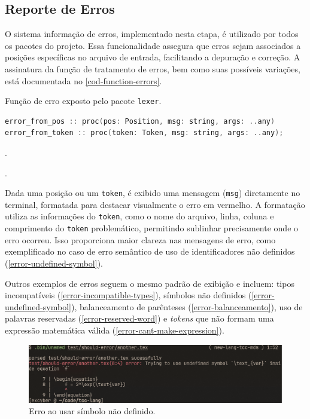 \subsection{Reporte de Erros} \label{subsection-erros}

O sistema informação de erros, implementado nesta etapa, é utilizado por todos os pacotes do projeto. Essa funcionalidade assegura que erros sejam associados a posições específicas no arquivo de entrada, facilitando a depuração e correção. A assinatura da função de tratamento de erros, bem como suas possíveis variações, está documentada no \autoref{cod-function-errors}.

\begin{codigo}[H]
    \caption{\small Função de erro exposto pelo pacote \texttt{lexer}. }
        \label{cod-function-errors}
\begin{lstlisting}[language=C++]
error_from_pos :: proc(pos: Position, msg: string, args: ..any)
error_from_token :: proc(token: Token, msg: string, args: ..any);
\end{lstlisting}.
\end{codigo}.



Dada uma posição ou um \texttt{token}, é exibido uma mensagem (\texttt{msg}) diretamente no terminal, formatada para destacar visualmente o erro em vermelho. A formatação utiliza as informações do \texttt{token}, como o nome do arquivo, linha, coluna e comprimento do \texttt{token} problemático, permitindo sublinhar precisamente onde o erro ocorreu. Isso proporciona maior clareza nas mensagens de erro, como exemplificado no caso de erro semântico de uso de identificadores não definidos (\autoref{error-undefined-symbol}).

Outros exemplos de erros seguem o mesmo padrão de exibição e incluem: tipos incompatíveis (\autoref{error-incompatible-types}), símbolos não definidos (\autoref{error-undefined-symbol}), balanceamento de parênteses (\autoref{error-balanceamento}), uso de palavras reservadas (\autoref{error-reserved-word}) e \textit{tokens} que não formam uma expressão matemática válida (\autoref{error-cant-make-expression}).

\begin{figure}[H]
    \caption{\label{error-undefined-symbol} \small Erro ao usar símbolo não definido.}
    \begin{center}
        \includegraphics[scale=0.5]{./Imagens/error-undefined-symbol.png}
    \end{center}
\end{figure}

